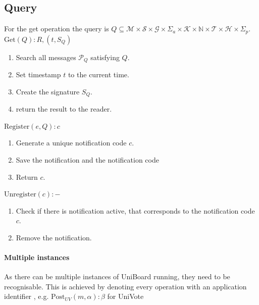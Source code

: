 \documentclass[bibtotoc,halfparskip,oneside]{scrreprt}
\begin{document}
	\subsection{Query}
	For the get operation the query is  $Q\subseteq\mathcal{M}\times\mathcal{S}\times\mathcal{G}\times\Sigma_a\times\mathcal{K}\times\mathbb{N}\times\mathcal{T}\times\mathcal{H}\times\Sigma_p$. \newline\newline
	$\mathrm{Get}(Q): R, (t, S_Q)$
	\begin{enumerate}
		\item Search all messages $\mathcal{P}_Q$ satisfying $Q$.
		\item Set timestamp $t$ to the current time.
		\item Create the signature $S_Q$.
		\item return the result to the reader.
	\end{enumerate}
	$\mathrm{Register}(e, Q): c$
	\begin{enumerate}
		\item Generate a unique notification code $c$.
		\item Save the notification and the notification code
		\item Return $c$.
	\end{enumerate}
	$\mathrm{Unregister}(c): -$
	\begin{enumerate}
		\item Check if there is notification active, that corresponds to the notification code $c$.
		\item Remove the notification.
	\end{enumerate}
	
	\paragraph*{Multiple instances}
	As there can be multiple instances of UniBoard running, they need to be recognisable. This is achieved by denoting every operation with an application identifier , e.g. $\mathrm{Post}_{UV}(m,\alpha):\beta$ for UniVote 
	
	
\end{document}

